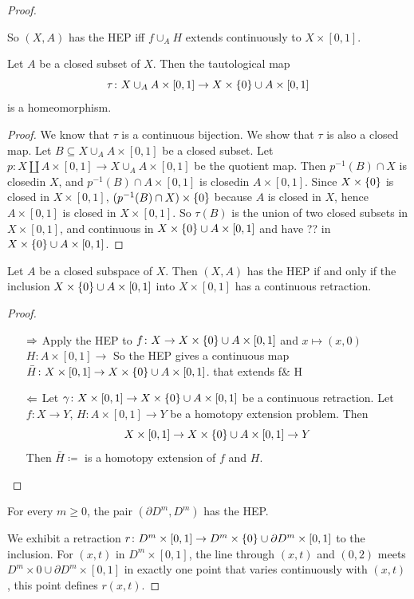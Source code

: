 \documentclass{TemplateLecture}
\begin{document}
\begin{proof}
\begin{proposition}
        So \((X,A)\) has the HEP iff \(f\cup_A H\) extends continuously to \(X\times [0,1]\).
    \end{proposition}
    \begin{lem}
        Let \(A\) be a closed subset of \(X\). Then the tautological map
        \[\tau\colon X\cup_A A\times [0,1] \to X \times \{0\} \cup A \times [0,1]\] is a homeomorphism.
    \end{lem}
    \begin{proof}
        We know that \(\tau\) is a continuous bijection. We show that \(\tau\) is also a closed map. Let \(B\subseteq X\cup_A A\times [0,1]\) be a closed subset. Let \(p\colon X \amalg A \times [0,1] \to X \cup_A A\times [0,1]\) be the quotient map. Then \(p^{-1}(B) \cap X\) is closedin \(X\), and \(p^{-1}(B) \cap A \times[0,1]\) is closedin \(A\times [0,1]\). Since \(X\times \{0\}\) is closed in \(X\times [0,1]\), \((p^{-1}(B)\cap X) \times \{0\}\) because \(A\) is closed in \(X\), hence \(A\times [0,1]\) is closed in \(X\times [0,1]\).
        So \(\tau(B)\) is the union of two closed subsets in \(X\times [0,1]\), and continuous in \(X\times \{0\} \cup A \times [0,1]\) and have ?? in \(X\times \{0\} \cup A \times [0,1]\).
    \end{proof}
    \begin{corollary}
        Let \(A\) be a closed subspace of \(X\). Then \((X,A)\) has the HEP if and only if the inclusion \(X\times \{0\} \cup A \times [0,1]\) into \(X\times [0,1]\) has a continuous retraction.
    \end{corollary}
    \begin{proof}
        \begin{itemize}
            \item[\(\Rightarrow\)] Apply the HEP to \(f\colon X \to X\times \{0\} \cup A \times [0,1]\) and \(x \mapsto (x,0)\)
            \(H\colon A \times[0,1] \to \)%
            So the HEP gives a continuous map \(\bar H\colon X \times [0,1] \to X\times\{0\} \cup A \times [0,1]\). that extends f\& H
            \item[\(\Leftarrow\)] Let \(\gamma \colon X \times [0,1] \to X \times \{0\} \cup A \times [0,1]\) be a continuous retraction. Let \(f\colon X\to Y\), \(H\colon A \times [0,1] \to Y\) be a homotopy extension problem. Then
            \[X \times [0,1] \to X \times \{0\} \cup A \times [0,1] \to Y\]
            Then \(\bar H \coloneq \)%
            is a homotopy extension of \(f\) and \(H\).
        \end{itemize}
    \end{proof}
    \begin{proposition}
        For every \(m \geq 0\), the pair \((\partial D^m, D^m)\) has the HEP. 
    \end{proposition}
    We exhibit a retraction \(r\colon D^m \times [0,1] \to D^m \times \{0\} \cup \partial D^m \times [0,1]\) to the inclusion.
    For \((x,t) \) in \(D^m \times [0,1]\), the line through \((x,t)\) and \((0,2)\) meets \(D^m \times 0 \cup \partial D^m \times [0,1]\) in exactly one point that varies continuously with \((x,t)\), this point defines \(r(x,t)\).


\end{proof}
\end{document}
